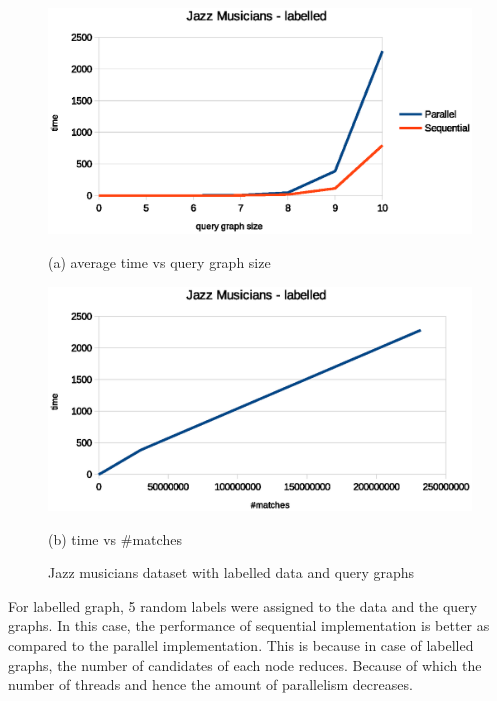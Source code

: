 \begin{figure}[h!]
    \centering
    \begin{minipage}[b]{.45\textwidth}
        \hspace*{-0.5in}
        \includegraphics[scale=0.55]{images/Jazz_labelled.eps}
        \caption*{(a) average time vs query graph size}        
    \end{minipage} \hfill  
    \begin{minipage}[b]{.45\textwidth}
        \hspace*{-0.2in}
        \includegraphics[scale=0.55]{images/Jazz_labelled_tpm.eps}
        \caption*{(b) time vs \#matches}       
    \end{minipage}   
\caption{Jazz musicians dataset with labelled data and query graphs}
\label{fig:distmx}
\end{figure}

For labelled graph, 5 random labels were assigned to the data and the query graphs. In this case, the performance of sequential implementation is better as compared to the parallel implementation. This is because in case of labelled graphs, the number of candidates of each node reduces. Because of which the
number of threads and hence the amount of parallelism decreases.

